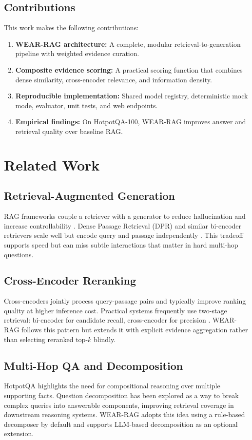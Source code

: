 \documentclass[10pt,draftclsnofoot,onecolumn,journal]{IEEEtran}
\begin{document}
\subsection{Contributions}
This work makes the following contributions:
\begin{enumerate}
\item \textbf{WEAR-RAG architecture:} A complete, modular retrieval-to-generation pipeline with weighted evidence curation.
\item \textbf{Composite evidence scoring:} A practical scoring function that combines dense similarity, cross-encoder relevance, and information density.
\item \textbf{Reproducible implementation:} Shared model registry, deterministic mock mode, evaluator, unit tests, and web endpoints.
\item \textbf{Empirical findings:} On HotpotQA-100, WEAR-RAG improves answer and retrieval quality over baseline RAG.
\end{enumerate}

\section{Related Work}
\subsection{Retrieval-Augmented Generation}
RAG frameworks couple a retriever with a generator to reduce hallucination and increase controllability \cite{lewis2020rag,guu2020realm}. Dense Passage Retrieval (DPR) and similar bi-encoder retrievers scale well but encode query and passage independently \cite{karpukhin2020dpr}. This tradeoff supports speed but can miss subtle interactions that matter in hard multi-hop questions.

\subsection{Cross-Encoder Reranking}
Cross-encoders jointly process query-passage pairs and typically improve ranking quality at higher inference cost. Practical systems frequently use two-stage retrieval: bi-encoder for candidate recall, cross-encoder for precision \cite{nogueira2019passage}. WEAR-RAG follows this pattern but extends it with explicit evidence aggregation rather than selecting reranked top-$k$ blindly.

\subsection{Multi-Hop QA and Decomposition}
HotpotQA \cite{yang2018hotpotqa} highlights the need for compositional reasoning over multiple supporting facts. Question decomposition has been explored as a way to break complex queries into answerable components, improving retrieval coverage in downstream reasoning systems. WEAR-RAG adopts this idea using a rule-based decomposer by default and supports LLM-based decomposition as an optional extension.
\end{document}
